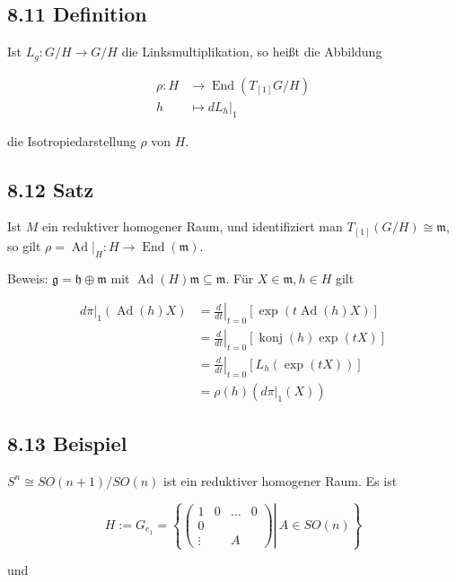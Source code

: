 \documentclass[10pt, letterpaper]{article}
\begin{document}
\subsection*{8.11 Definition}
Ist $L_{g}: G / H \rightarrow G / H$ die Linksmultiplikation, so heißt die Abbildung

$$
\begin{aligned}
\rho: H & \rightarrow \operatorname{End}\left(T_{[1]} G / H\right) \\
h & \left.\mapsto d L_{h}\right|_{1}
\end{aligned}
$$

die Isotropiedarstellung $\rho$ von $H$.

\subsection*{8.12 Satz}
Ist $M$ ein reduktiver homogener Raum, und identifiziert man $T_{[1]}(G / H) \cong \mathfrak{m}$, so gilt $\rho=\left.\operatorname{Ad}\right|_{H}: H \rightarrow \operatorname{End}(\mathfrak{m})$.

Beweis: $\mathfrak{g}=\mathfrak{h} \oplus \mathfrak{m}$ mit $\operatorname{Ad}(H) \mathfrak{m} \subseteq \mathfrak{m}$. Für $X \in \mathfrak{m}, h \in H$ gilt

$$
\begin{aligned}
\left.d \pi\right|_{1}(\operatorname{Ad}(h) X) & =\left.\frac{d}{d t}\right|_{t=0}[\exp (t \operatorname{Ad}(h) X)] \\
& =\left.\frac{d}{d t}\right|_{t=0}[\operatorname{konj}(h) \exp (t X)] \\
& =\left.\frac{d}{d t}\right|_{t=0}\left[L_{h}(\exp (t X))\right] \\
& =\rho(h)\left(\left.d \pi\right|_{1}(X)\right)
\end{aligned}
$$

\subsection*{8.13 Beispiel}
$S^{n} \cong S O(n+1) / S O(n)$ ist ein reduktiver homogener Raum. Es ist

$$
H:=G_{e_{1}}=\left\{\left.\left(\begin{array}{cccc}
1 & 0 & \ldots & 0 \\
0 & & & \\
\vdots & & A &
\end{array}\right) \right\rvert\, A \in S O(n)\right\}
$$

und
\end{document}
